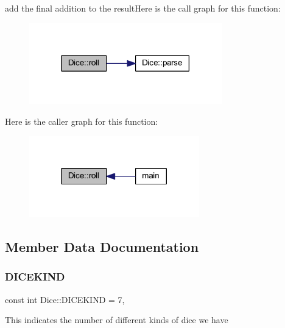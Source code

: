 add the final addition to the resultHere is the call graph for this function\+:\nopagebreak
\begin{figure}[H]
\begin{center}
\leavevmode
\includegraphics[width=237pt]{class_dice_a4ca42849612d2c9182f1d93deaa4cfb1_a4ca42849612d2c9182f1d93deaa4cfb1_cgraph}
\end{center}
\end{figure}
Here is the caller graph for this function\+:\nopagebreak
\begin{figure}[H]
\begin{center}
\leavevmode
\includegraphics[width=209pt]{class_dice_a4ca42849612d2c9182f1d93deaa4cfb1_a4ca42849612d2c9182f1d93deaa4cfb1_icgraph}
\end{center}
\end{figure}


\subsection{Member Data Documentation}
\hypertarget{class_dice_afb857d94c4abede11939a308770ea72b_afb857d94c4abede11939a308770ea72b}{}\label{class_dice_afb857d94c4abede11939a308770ea72b_afb857d94c4abede11939a308770ea72b} 
\subsubsection{\texorpdfstring{D\+I\+C\+E\+K\+I\+ND}{DICEKIND}}
{\footnotesize\ttfamily const int Dice\+::\+D\+I\+C\+E\+K\+I\+ND = 7\hspace{0.3cm}{\ttfamily [static]}, {\ttfamily [private]}}

This indicates the number of different kinds of dice we have \hypertarget{class_dice_a0a00c7ba6e7486d9cbcf7c8c64c65b1a_a0a00c7ba6e7486d9cbcf7c8c64c65b1a}{}\label{class_dice_a0a00c7ba6e7486d9cbcf7c8c64c65b1a_a0a00c7ba6e7486d9cbcf7c8c64c65b1a} 
